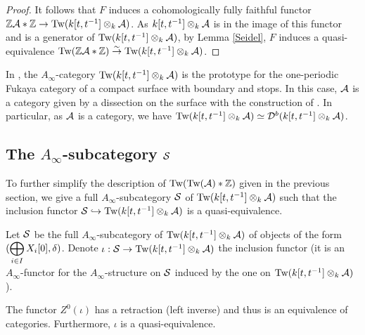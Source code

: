 \documentclass[12pt]{article}
\begin{document}
\begin{proof}
		\noindent It follows that $F$ induces a cohomologically fully faithful functor $\mathbb{Z} {\cal{A}} * \mathbb{Z} \to \textup{Tw}(k[t,t^{-1}] \otimes_k {\cal{A}})$. As $k[t,t^{-1}] \otimes_k {\cal{A}}$ is in the image of this functor and is a generator of $\textup{Tw}(k[t,t^{-1}] \otimes_k {\cal{A}})$, by Lemma \ref{Seidel}, $F$ induces a quasi-equivalence $\textup{Tw}(\mathbb{Z} {\cal{A}} * \mathbb{Z}) \overset{\sim}{\to} \textup{Tw}(k[t,t^{-1}] \otimes_k {\cal{A}})$.
	\end{proof}
	
	\begin{remark}
		In \cite{Chr}, the $A_\infty$-category $\textup{Tw}(k[t,t^{-1}] \otimes_k {\cal{A}})$ is the prototype for the one-periodic Fukaya category of a compact surface with boundary and stops. In this case, ${\cal{A}}$ is a category given by a dissection on the surface with the construction of \cite{HKK}. In particular, as ${\cal{A}}$ is a category, we have $\textup{Tw}(k[t,t^{-1}] \otimes_k {\cal{A}}) \simeq {\cal{D}}^b(k[t,t^{-1}] \otimes_k {\cal{A}})$.
	\end{remark}
	
	\subsection{The $A_\infty$-subcategory ${\cal{S}}$}
	
	\noindent To further simplify the description of $\textup{Tw}(\textup{Tw}({\cal{A}}) * \mathbb{Z})$ given in the previous section, we give a full $A_\infty$-subcategory ${\cal{S}}$ of $\textup{Tw}(k[t,t^{-1}] \otimes_k {\cal{A}})$ such that the inclusion functor ${\cal{S}} \hookrightarrow \textup{Tw}(k[t,t^{-1}] \otimes_k {\cal{A}})$ is a quasi-equivalence.
	
	\begin{definition}
		\label{defScat}
		Let ${\cal{S}}$ be the full $A_\infty$-subcategory of $\textup{Tw}(k[t,t^{-1}] \otimes_k {\cal{A}})$ of objects of the form $(\displaystyle\bigoplus_{i \in I} X_i[0],\delta)$. Denote $\iota: {\cal{S}} \to \textup{Tw}(k[t,t^{-1}] \otimes_k {\cal{A}})$ the inclusion functor (it is an $A_\infty$-functor for the $A_\infty$-structure on ${\cal{S}}$ induced by the one on $\textup{Tw}(k[t,t^{-1}] \otimes_k {\cal{A}})$).
	\end{definition}
	
	\begin{proposition}
		\label{retract}
		The functor $Z^0(\iota)$ has a retraction (left inverse) and thus is an equivalence of categories. Furthermore, $\iota$ is a quasi-equivalence.
	\end{proposition}
	
\end{document}
